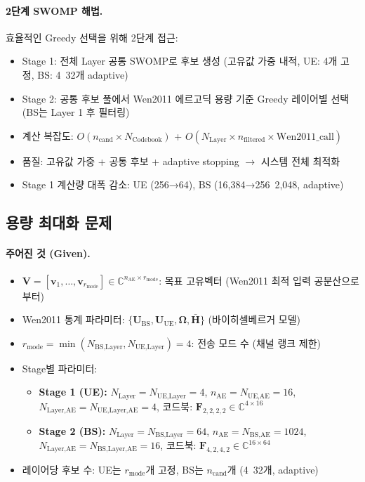 \documentclass[10pt]{article}
\begin{document}
\paragraph{2단계 SWOMP 해법.}
효율적인 Greedy 선택을 위해 2단계 접근:
\begin{itemize}
    \item Stage 1: 전체 Layer 공통 SWOMP로 후보 생성 (고유값 가중 내적, UE: 4개 고정, BS: 4~32개 adaptive)
    \item Stage 2: 공통 후보 풀에서 Wen2011 에르고딕 용량 기준 Greedy 레이어별 선택 (BS는 Layer 1 후 필터링)
    \item 계산 복잡도: $O(n_{\text{cand}} \times N_{\text{Codebook}})$ + $O(N_{\text{Layer}} \times n_{\text{filtered}} \times \text{Wen2011\_call})$
    \item 품질: 고유값 가중 + 공통 후보 + adaptive stopping $\rightarrow$ 시스템 전체 최적화
    \item Stage 1 계산량 대폭 감소: UE (256→64), BS (16,384→256~2,048, adaptive)
\end{itemize}

\subsection{용량 최대화 문제}

\paragraph{주어진 것 (Given).}
\begin{itemize}
    \item $\mathbf{V} = [\mathbf{v}_1, \ldots, \mathbf{v}_{r_{\text{mode}}}] \in \mathbb{C}^{n_{\text{AE}} \times r_{\text{mode}}}$: 목표 고유벡터 (Wen2011 최적 입력 공분산으로부터)
    \item Wen2011 통계 파라미터: $\{\mathbf{U}_{\text{BS}}, \mathbf{U}_{\text{UE}}, \boldsymbol{\Omega}, \bar{\mathbf{H}}\}$ (바이히셀베르거 모델)
    \item $r_{\text{mode}} = \min(N_{\text{BS,Layer}}, N_{\text{UE,Layer}}) = 4$: 전송 모드 수 (채널 랭크 제한)
    \item Stage별 파라미터:
    \begin{itemize}
        \item \textbf{Stage 1 (UE):} $N_{\text{Layer}} = N_{\text{UE,Layer}} = 4$, $n_{\text{AE}} = N_{\text{UE,AE}} = 16$, $N_{\text{Layer,AE}} = N_{\text{UE,Layer,AE}} = 4$, 코드북: $\mathbf{F}_{2,2,2,2} \in \mathbb{C}^{4 \times 16}$
        \item \textbf{Stage 2 (BS):} $N_{\text{Layer}} = N_{\text{BS,Layer}} = 64$, $n_{\text{AE}} = N_{\text{BS,AE}} = 1024$, $N_{\text{Layer,AE}} = N_{\text{BS,Layer,AE}} = 16$, 코드북: $\mathbf{F}_{4,2,4,2} \in \mathbb{C}^{16 \times 64}$
    \end{itemize}
    \item 레이어당 후보 수: UE는 $r_{\text{mode}}$개 고정, BS는 $n_{\text{cand}}$개 (4~32개, adaptive)
\end{itemize}
\end{document}
